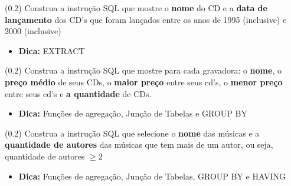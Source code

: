 \documentclass[12pt]{exam}
\begin{document}
\begin{questions}
\question (0.2)  Construa a instrução SQL que mostre o \textbf{nome} do CD e a \textbf{data de lançamento} dos CD's que foram lançados entre os anos de 1995 (inclusive) e 2000 (inclusive)

\begin{itemize}
    \item \textbf{Dica:} EXTRACT
\end{itemize}




\question (0.2) Construa a instrução SQL que mostre para cada gravadora: o \textbf{nome}, o \textbf{preço médio} de seus CDs, o \textbf{maior preço} entre seus cd's, o \textbf{menor preço} entre seus cd's e \textbf{a quantidade} de CDs.

\begin{itemize}
    \item \textbf{Dica:} Funções de agregação, Junção de Tabelas e GROUP BY
\end{itemize}


\question (0.2) Construa a instrução SQL que selecione o \textbf{nome} das músicas e a \textbf{quantidade de autores} das músicas que tem mais de um autor, ou seja, quantidade de autores $\geq 2$

\begin{itemize}
    \item \textbf{Dica:} Funções de agregação, Junção de Tabelas, GROUP BY e HAVING
\end{itemize}



\end{questions}
\end{document}
